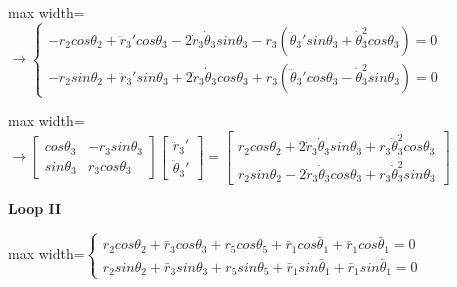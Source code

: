 \documentclass[11pt,a4paper]{article}
\begin{document}
\begin{center}\begin{adjustbox}{max width=\linewidth}$\displaystyle \rightarrow \left\{ \begin{gathered}-{r}_{2}cos{\theta }_{2}+{\ddot{r}}_{3}'cos{\theta }_{3}-2{\dot{r}}_{3}{\dot{\theta }}_{3}sin{\theta }_{3}-{r}_{3}\left( {\ddot{\theta }}_{3}'sin{\theta }_{3}+{\dot{\theta }}_{3}^{2}cos{\theta }_{3}\right)=0\\-{r}_{2}sin{\theta }_{2}+{\ddot{r}}_{3}'sin{\theta }_{3}+2{\dot{r}}_{3}{\dot{\theta }}_{3}cos{\theta }_{3}+{r}_{3}\left( {\ddot{\theta }}_{3}'cos{\theta }_{3}-{\dot{\theta }}_{3}^{2}sin{\theta }_{3}\right)=0\end{gathered}\right.$\end{adjustbox}\end{center}

\begin{center}\begin{adjustbox}{max width=\linewidth}$\displaystyle \rightarrow \left[ \begin{matrix}cos{\theta }_{3} & -{r}_{3}sin{\theta }_{3}\\sin{\theta }_{3} & {r}_{3}cos{\theta }_{3}\end{matrix}\right]\left[ \begin{gathered}{\ddot{r}}_{3}'\\{\ddot{\theta }}_{3}'\end{gathered}\right]=\left[ \begin{gathered}{r}_{2}cos{\theta }_{2}+2{\dot{r}}_{3}{\dot{\theta }}_{3}sin{\theta }_{3}+{r}_{3}{\dot{\theta }}_{3}^{2}cos{\theta }_{3}\\{r}_{2}sin{\theta }_{2}-2{\dot{r}}_{3}{\dot{\theta }}_{3}cos{\theta }_{3}+{r}_{3}{\dot{\theta }}_{3}^{2}sin{\theta }_{3}\end{gathered}\right]$\end{adjustbox}\end{center}

\textbf{Loop II}

\begin{center}\begin{adjustbox}{max width=\linewidth}$\displaystyle \left\{ \begin{gathered}{r}_{2}cos{\theta }_{2}+{\bar{r}}_{3}cos{\theta }_{3}+{r}_{5}cos{\theta }_{5}+{\bar{r}}_{1}cos{\bar{\theta }}_{1}+{\bar{r}}_{1}cos{\bar{\theta }}_{1}=0\\{r}_{2}sin{\theta }_{2}+{\bar{r}}_{3}sin{\theta }_{3}+{r}_{5}sin{\theta }_{5}+{\bar{r}}_{1}sin{\bar{\theta }}_{1}+{\bar{r}}_{1}sin{\bar{\theta }}_{1}=0\end{gathered}\right.$\end{adjustbox}\end{center}
\end{document}
